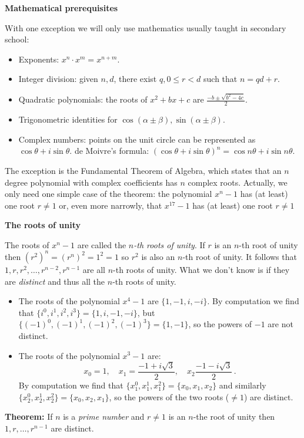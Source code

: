 \documentclass[a4paper,11pt]{article}
\begin{document}
\textbf{Mathematical prerequisites}

With one exception we will only use mathematics usually taught in secondary school:
\begin{itemize}
\item Exponents: $x^n\cdot x^m=x^{n+m}$.
\item Integer division: given $n,d$, there exist $q,0\leq r<d$ such that $n=qd+r$.
\item Quadratic polynomials: the roots of $x^2+bx+c$ are $\frac{-b\pm\sqrt{b^2-4c}}{2}$.
\item Trigonometric identities for $\cos(\alpha\pm\beta),\sin(\alpha\pm\beta)$.
\item Complex numbers: points on the unit circle can be represented as $\cos\theta +i\sin\theta$. de Moivre's formula: $(\cos\theta +i\sin\theta)^n=\cos n\theta +i\sin n\theta$.
\end{itemize}
 The exception is the Fundamental Theorem of Algebra, which states that an $n$ degree polynomial with complex coefficients has $n$ complex roots. Actually, we only need one simple case of the theorem: the polynomial $x^{n}-1$ has (at least) one root $r\neq 1$ or, even more narrowly, that $x^{17}-1$ has (at least) one root $r\neq 1$

\textbf{The roots of unity}

The roots of $x^{n}-1$ are called the \emph{$n$-th roots of unity}. If $r$ is an $n$-th root of unity then $(r^{2})^n=(r^{n})^2=1^2=1$ so $r^2$ is also an $n$-th root of unity. It follows that $1, r, r^2, \ldots, r^{n-2}, r^{n-1}$ are all $n$-th roots of unity. What we don't know is if they are \emph{distinct} and thus all the $n$-th roots of unity.
\begin{itemize}
\item The roots of the polynomial $x^4-1$ are $\{1,-1,i,-i\}$. By computation we find that $\{i^0,i^1,i^2,i^3\}=\{1,i,-1,-i\}$, but $\{(-1)^0,(-1)^1,(-1)^2,(-1)^3\}=\{1,-1\}$, so the powers of $-1$ are not distinct.
\item The roots of the polynomial $x^3-1$ are:
\[
x_0=1,\quad x_1=\frac{-1+i\sqrt{3}}{2},\quad x_2\frac{-1-i\sqrt{3}}{2}\,.
\]
By computation we find that $\{x_1^0,x_1^1,x_1^2\}=\{x_0,x_1,x_2\}$ and similarly $\{x_2^0,x_2^1,x_2^2\}=\{x_0,x_2,x_1\}$, so the powers of the two roots ($\neq 1$) are distinct.
\end{itemize}

\textbf{Theorem:} If $n$ is a \emph{prime number} and $r\neq 1$ is an $n$-the root of unity then $1,r,\ldots,r^{n-1}$ are distinct.
\end{document}
